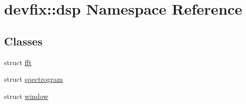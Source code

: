 \hypertarget{namespacedevfix_1_1dsp}{}\section{devfix\+:\+:dsp Namespace Reference}
\label{namespacedevfix_1_1dsp}
\subsection*{Classes}
\begin{DoxyCompactItemize}
\item 
struct \hyperlink{structdevfix_1_1dsp_1_1fft}{fft}
\item 
struct \hyperlink{structdevfix_1_1dsp_1_1spectrogram}{spectrogram}
\item 
struct \hyperlink{structdevfix_1_1dsp_1_1window}{window}
\end{DoxyCompactItemize}
